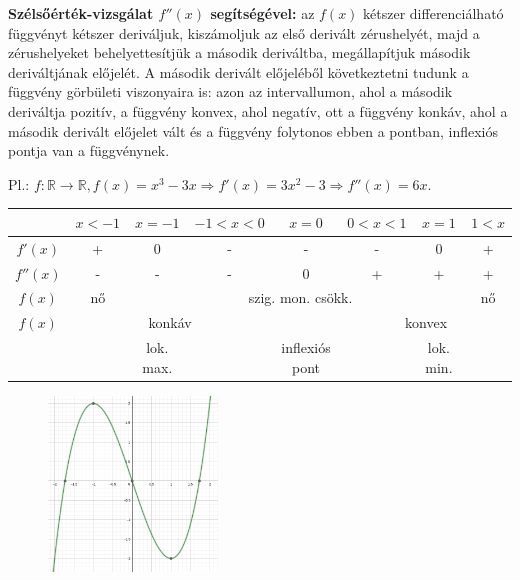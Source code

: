\documentclass[12pt,a4paper]{article}
\begin{document}
\textbf{Szélsőérték-vizsgálat $f''(x)$ segítségével:} az $f(x)$ kétszer differenciálható függvényt kétszer deriváljuk, kiszámoljuk az első derivált zérushelyét, majd a zérushelyeket behelyettesítjük a második deriváltba, megállapítjuk második deriváltjának előjelét. A második derivált előjeléből következtetni tudunk a függvény görbületi viszonyaira is: azon az intervallumon, ahol a második deriváltja pozitív, a függvény konvex, ahol negatív, ott a függvény konkáv, ahol a második derivált előjelet vált és a függvény folytonos ebben a pontban, inflexiós pontja van a függvénynek.

Pl.: $f:\mathbb{R}\to \mathbb{R}, f(x)=x^3-3x\Rightarrow f'(x)=3x^2-3\Rightarrow f''(x)=6x$.

\begin{tabular}{|c|c|c|c|c|c|c|c|}
\hline 
 & $x<-1$ & $x=-1$ & $-1<x<0$ & $x=0$ & $0<x<1$ & $x=1$ & $1<x$ \\ 
\hline 
$f'(x)$ & + & 0 & - & - & - & 0 & + \\ 
\hline 
$f''(x)$ & - & - & - & 0 & + & + & + \\ 
\hline
\hline 
$f(x)$ & nő &  & \multicolumn{3}{c|}{szig. mon. csökk.} &  & nő \\ 
\hline
$f(x)$ & \multicolumn{3}{c|}{konkáv} &  & \multicolumn{3}{c|}{konvex} \\ 
\hline 
\hline
 &  & lok. max. &  & inflexiós pont &  & lok. min. &  \\ 
\hline 
\end{tabular} 

\begin{figure}[h]
\centering
\includegraphics[width=0.4\textwidth]{fgv_elemzes}
\end{figure}
\vspace{30px}
\end{document}
